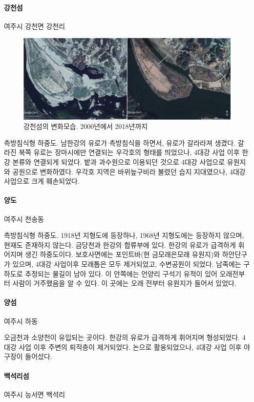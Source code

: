 \paragraph{강천섬}
여주시 강천면 강천리

\begin{figure}[ht]
    \centering
    \includegraphics[width=.8\textwidth]{img/강천섬.jpg}
    \caption{강천섬의 변화모습. 2000년에서 2018년까지 }
    \label{fig:my_labe612}
\end{figure}

측방침식형 하중도. 남한강의 유로가 측방침식을 하면서, 유로가 갈라라져 생겼다.
갈라진 북쪽 유로는 장마시에만 연결되는 우각호의 형태를 띄었으나, 4대강 사업 이후 한강 본류와 연결되게 되었다.
밭과 과수원으로 이용되던 것으로 4대강 사업으로 유원지와 공원으로 변화하였다.
우각호 지역은 바위늪구비라 불렸던 습지 지대였으나, 4대강 사업으로 크게 훼손되었다.

\paragraph{양도}
여주시 천송동

측방침식형 하중도. 1918년 지형도에 등장하나, 1968년 지형도에는 등장하지 않으며, 현재도 존재하지 않는다.
금당천과 한강의 합류부에 있다.
한강의 유로가 급격하게 휘어지며 생긴 하중도이다. 보호사면에는 포인트바(현 금모래은모래 유원지)와 하안단구가 있으며,
4대강 사업이후 모래톱은 모두 제거되었고, 수변공원이 되었다. 남족에는 구하도로 추정되는 물길이 남아 있다.
이 안쪽에는 언양리 구석기 유적이 있어 오래전부터 사람이 거주했음을 알 수 있다.
이 곳에는 오래 전부터 유원지가 들어서 있었다.
\paragraph{양섬}
여주시 하동

오금천과 소양천이 유입되는 곳이다. 한강의 유로가 급격하게 휘어지며 형성되었다. 4대강 사업 이후 주변의 퇴적층이 제거되었다.
논으로 활옹되었으나, 4대강 사업 이후 야구장이 들어섰다.

\paragraph{백석리섬}
여주시 능서면 백석리

